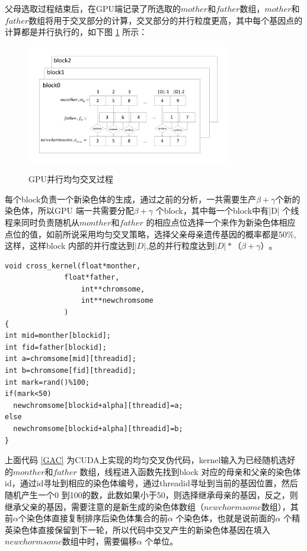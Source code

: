 父母选取过程结束后，在GPU端记录了所选取的$mother$和$father$数组，$mother$和$father$数组将用于交叉部分的计算，交叉部分的并行粒度更高，其中每个基因点的计算都是并行执行的，如下图 \ref{cross} 所示：
\begin{figure}
  \begin{center}
    {\includegraphics[width=0.8\textwidth]{figures/GPUcross.pdf}}
    \end{center}
  \caption{{\footnotesize{GPU并行均匀交叉过程}}}
  \label{cross}
\end{figure}
每个block负责一个新染色体的生成，通过之前的分析，一共需要生产$\beta+\gamma$个新的染色体，所以GPU 端一共需要分配$\beta+\gamma$ 个block，其中每一个block中有|D| 个线程来同时负责随机从$monther$和$father$ 的相应点位选择一个来作为新染色体相应点位的值，如前所说采用均匀交叉策略，选择父亲母亲遗传基因的概率都是50\%,这样，这样block 内部的并行度达到$|D|$,总的并行粒度达到$|D|*（\beta+\gamma）$。
\begin{lstlisting}[caption={并行交叉算法代码},captionpos=b,firstnumber=1,label={GAC}]
void cross_kernel(float*monther,
			  float*father,
	     		  int**chromsome,
                  int**newchromsome
			  )
{
int mid=monther[blockid];
int fid=father[blockid];
int a=chromsome[mid][threadid];
int b=chromsome[fid][threadid];
int mark=rand()%100;
if(mark<50)
  newchromsome[blockid+alpha][threadid]=a;
else
  newchromsome[blockid+alpha][threadid]=b;
}
\end{lstlisting}

上面代码 \ref{GAC} 为CUDA上实现的均匀交叉伪代码，kernel输入为已经随机选好的$monther$和$father$ 数组，线程进入函数先找到block 对应的母亲和父亲的染色体id，通过id寻址到相应的染色体编号，通过threadid寻址到当前的基因位置，然后随机产生一个0 到100的数，此数如果小于50，则选择继承母亲的基因，反之，则继承父亲的基因，需要注意的是新生成的染色体数组（$newchormsome$数组），其前$\alpha$个染色体直接复制排序后染色体集合的前$\alpha$ 个染色体，也就是说前面的$\alpha$ 个精英染色体直接保留到下一轮，所以代码中交叉产生的新染色体基因在填入$newchormsome$数组中时，需要偏移$\alpha$ 个单位。

